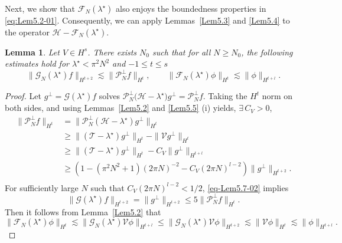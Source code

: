 \documentclass{sn-jnl}%
\numberwithin{equation}{section}
\theoremstyle{thmstyleone}%
\newtheorem{lemma}{Lemma}[section]%
\theoremstyle{thmstyletwo}%
\theoremstyle{thmstylethree}%
\begin{document}
Next, we show that $\mathcal{F}_N(\lambda^\star)$ also enjoys the  boundedness properties in \eqref{eq:Lem5.2-01}. Consequently, we can apply Lemmas~\ref{Lem5.3} and \ref{Lem5.4} to the operator $\mathcal{H} - \mathcal{F}_N(\lambda^\star)$.
\begin{lemma}\label{Lem5.7}
    Let $V\in H^{s}$. There exists $N_0$ such that for all $N\geq N_0$, the following estimates hold for $\lambda^\star < \pi ^2N^2$ and $-1\leq t\leq s$
    \begin{equation}
        \|\mathcal{G}_N(\lambda^\star)f\|_{H^{t+2}}\lesssim \|\mathcal{P}^\perp_Nf\|_{H^{t}},\qquad
        \|\mathcal{F}_N(\lambda^\star)\phi\|_{H^{t}}\lesssim \|\phi\|_{H^{t+l}}.
    \end{equation}
\end{lemma}
\begin{proof}
 Let $g^\perp = \mathcal{G}(\lambda^\star)f$ solves
 $ \mathcal{P}_N^\perp\bigl(\mathcal{H}-\lambda^\star\bigr)g^\perp=\mathcal{P}_N^\perp f$. Taking the $H^t$ norm on both sides, and using Lemmas~\ref{Lem5.2} and \ref{Lem5.5} (i) yields, $\exists\, C_V>0$,
\begin{equation}\label{eq-Lem5.7-02}
\begin{aligned}
    \|\mathcal{P}_N^\perp f\|_{H^{t}} 
    &= \|\mathcal{P}^\perp_N(\mathcal{H}-\lambda^\star)g^\perp\|_{H^{t}}\\
    &\geq \|(\mathcal{T}-\lambda^\star)g^\perp\|_{H^{t}}-\|\mathcal{V} g^\perp\|_{H^{t}}\\
    &\geq \|(\mathcal{T}-\lambda^\star)g^\perp\|_{H^{t}}-C_V\| g^\perp\|_{H^{t+l}}\\
     &\geq
    \left(1-(\pi^2N^2+1)(2\pi N)^{-2}-C_V(2\pi N)^{l-2}\right)\|g^\perp\|_{H^{t+2}}.\\
\end{aligned}
\end{equation}
For sufficiently large $N$ such that $C_V(2\pi N)^{l-2}<1/2$, \eqref{eq-Lem5.7-02} implies
\begin{equation}
    \|\mathcal{G}(\lambda^\star)f\|_{H^{t+2}}=\|g^\perp\|_{H^{t+2}}\leq 5\|\mathcal{P}_N^\perp f\|_{H^{t}}.
\end{equation}
Then it follows from Lemma~\ref{Lem5.2} that 
\begin{equation}
    \|\mathcal{F}_N(\lambda^\star)\phi\|_{H^{t}}\lesssim \|\mathcal{G}_N(\lambda^\star)\mathcal{V}\phi\|_{H^{t+l}}
    \leq \|\mathcal{G}_N(\lambda^\star)\mathcal{V}\phi\|_{H^{t+2}} \lesssim \|\mathcal{V}\phi\|_{H^{t}} \lesssim \|\phi\|_{H^{t+l}}.
\end{equation}
\end{proof}
\end{document}
